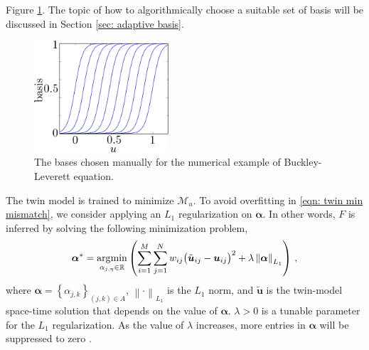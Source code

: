 Figure \ref{fig: sigmoid basis ad hoc}.
The topic of
how to algorithmically choose a suitable set of basis will be discussed 
in Section \ref{sec: adaptive basis}.\\
\begin{figure}[htbp]
    \begin{center}
        \includegraphics[width=5cm]{../fixed_basis_eg.png}
        \caption{The bases chosen manually for the numerical example of Buckley-Leverett equation.}
        \label{fig: sigmoid basis ad hoc}
    \end{center}
\end{figure}


The twin model is trained to minimize $\mathcal{M}_u$.
To avoid overfitting in \eqref{eqn: twin min mismatch}, we consider applying an
$L_1$ regularization on $\boldsymbol{\alpha}$. In other words,
$F$ is inferred by solving the following minimization problem,
\begin{equation}
    \boldsymbol{\alpha}^* = \operatorname*{\arg\!\min}_{\alpha_{j, \eta}\in \mathbb{R}} \left(
    \sum_{i=1}^M \sum_{j=1}^N w_{ij} \big( \tilde{\boldsymbol{u}}_{ij}
     -\boldsymbol{u}_{ij}\big)^2
 + \lambda\left\|\boldsymbol{\alpha}\right\|_{L_1} \right)
    \,,
    \label{eqn: solution mismatch L1 norm}
\end{equation}
where $\boldsymbol{\alpha} = \left\{\alpha_{j,k}\right\}_{\left(j,k\right)\in A}$, 
$\left\|\cdot\right\|_{L_1}$ is the $L_1$ norm, and
$\tilde{\boldsymbol{u}}$ is the twin-model space-time solution that depends on the value of
$\boldsymbol{\alpha}$.
$\lambda>0$ is a tunable parameter for
the $L_1$ regularization. As the value of $\lambda$ increases, more entries in $\boldsymbol{\alpha}$
will be suppressed to zero
\cite{Lasso variable selection}. \\


